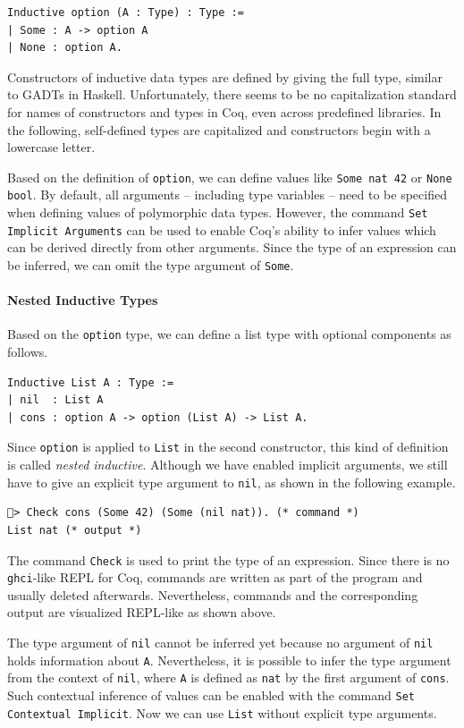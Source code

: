 \documentclass[a4paper, 11pt, fleqn, twoside, abstract=on]{scrreprt}
\newcommand{\hinl}[1]{\texttt{#1}}
\newcommand{\cinl}[1]{\texttt{#1}}
\begin{document}
\begin{verbatim}
Inductive option (A : Type) : Type := 
| Some : A -> option A 
| None : option A.
\end{verbatim}

Constructors of inductive data types are defined by giving the full type, similar to GADTs in Haskell.
Unfortunately, there seems to be no capitalization standard for names of constructors and types in Coq, even across predefined libraries.
In the following, self-defined types are capitalized and constructors begin with a lowercase letter.

Based on the definition of \cinl{option}, we can define values like \cinl{Some nat 42} or \cinl{None bool}.
By default, all arguments -- including type variables -- need to be specified when defining values of polymorphic data types.
However, the command \cinl{Set Implicit Arguments} can be used to enable Coq's ability to infer values which can be derived directly from other arguments.
Since the type of an expression can be inferred, we can omit the type argument of \cinl{Some}.

\paragraph{Nested Inductive Types}
Based on the \cinl{option} type, we can define a list type with optional components as follows.
\begin{verbatim}
Inductive List A : Type :=
| nil  : List A
| cons : option A -> option (List A) -> List A.
\end{verbatim}
\noindent
Since \cinl{option} is applied to \cinl{List} in the second constructor, this kind of definition is called \textit{nested inductive}.
Although we have enabled implicit arguments, we still have to give an explicit type argument to \cinl{nil}, as shown in the following example.

\begin{verbatim}
🐔> Check cons (Some 42) (Some (nil nat)). (* command *)
List nat (* output *)
\end{verbatim}

The command \cinl{Check} is used to print the type of an expression.
Since there is no \hinl{ghci}-like REPL for Coq, commands are written as part of the program and usually deleted afterwards.
Nevertheless, commands and the corresponding output are visualized REPL-like as shown above.

The type argument of \cinl{nil} cannot be inferred yet because no argument of \cinl{nil} holds information about \cinl{A}.
Nevertheless, it is possible to infer the type argument from the context of \cinl{nil}, where \cinl{A} is defined as \cinl{nat} by the first argument of \cinl{cons}.
Such contextual inference of values can be enabled with the command \cinl{Set Contextual Implicit}.
Now we can use \cinl{List} without explicit type arguments.
\end{document}
